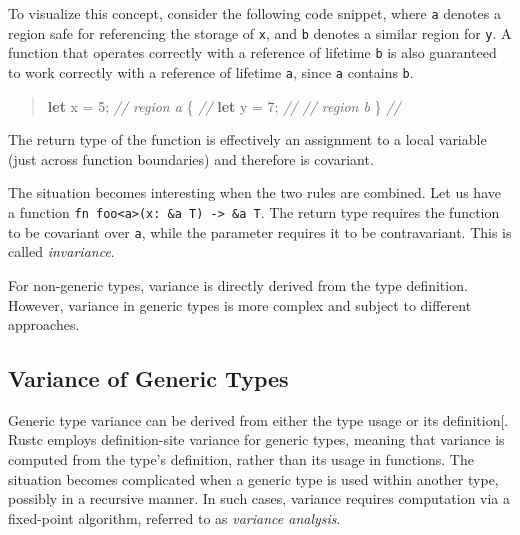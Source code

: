 \documentclass[
  11pt,
  twoside]{report}
\newenvironment{Shaded}{}{}
\newcommand{\CommentTok}[1]{\textit{#1}}
\newcommand{\DecValTok}[1]{#1}
\newcommand{\KeywordTok}[1]{\textbf{#1}}
\newcommand{\NormalTok}[1]{#1}
\newcommand{\OperatorTok}[1]{#1}
\begin{document}
To visualize this concept, consider the following code snippet, where
\texttt{\textquotesingle{}a} denotes a region safe for referencing the
storage of \texttt{x}, and \texttt{\textquotesingle{}b} denotes a
similar region for \texttt{y}. A function that operates correctly with a
reference of lifetime \texttt{\textquotesingle{}b} is also guaranteed to
work correctly with a reference of lifetime
\texttt{\textquotesingle{}a}, since \texttt{\textquotesingle{}a}
contains \texttt{\textquotesingle{}b}.

\begin{quote}
\begin{Shaded}
\begin{Highlighting}[]
 \KeywordTok{let}\NormalTok{ x }\OperatorTok{=} \DecValTok{5}\OperatorTok{;}        \CommentTok{// region \textquotesingle{}a}
 \OperatorTok{\{}                 \CommentTok{//}
     \KeywordTok{let}\NormalTok{ y }\OperatorTok{=} \DecValTok{7}\OperatorTok{;}    \CommentTok{//            // region \textquotesingle{}b        }
 \OperatorTok{\}}                 \CommentTok{//}
\end{Highlighting}
\end{Shaded}
\end{quote}

The return type of the function is effectively an assignment to a local
variable (just across function boundaries) and therefore is covariant.

The situation becomes interesting when the two rules are combined. Let
us have a function
\texttt{fn\ foo\textless{}\textquotesingle{}a\textgreater{}(x:\ \&\textquotesingle{}a\ T)\ -\textgreater{}\ \&\textquotesingle{}a\ T}.
The return type requires the function to be covariant over
\texttt{\textquotesingle{}a}, while the parameter requires it to be
contravariant. This is called \emph{invariance}.

For non-generic types, variance is directly derived from the type
definition. However, variance in generic types is more complex and
subject to different approaches.

\subsection{Variance of Generic
Types}\label{sec:variance-of-generic-types}

Generic type variance can be derived from either the type usage or its
definition{[}\citeproc{ref-Altidor2011}{16}{]}. Rustc employs
definition-site variance for generic types, meaning that variance is
computed from the type's definition, rather than its usage in functions.
The situation becomes complicated when a generic type is used within
another type, possibly in a recursive manner. In such cases, variance
requires computation via a fixed-point algorithm, referred to as
\emph{variance analysis}.
\end{document}
